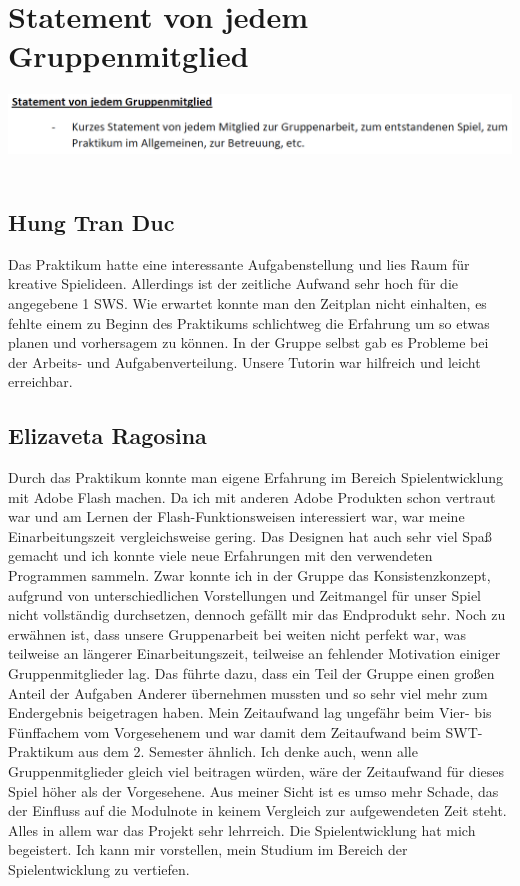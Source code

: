 \documentclass[a4paper, 11pt]{article} %
\begin{document}
\section{Statement von jedem Gruppenmitglied}
\includegraphics[scale=0.5]{images/statement.png}\\\\
\subsection{Hung Tran Duc}
Das Praktikum hatte eine interessante Aufgabenstellung und lies Raum für kreative Spielideen.
Allerdings ist der zeitliche Aufwand sehr hoch für die angegebene 1 SWS.
Wie erwartet konnte man den Zeitplan nicht einhalten, es fehlte einem zu Beginn des Praktikums schlichtweg 
die Erfahrung um so etwas planen und vorhersagem zu können.
In der Gruppe selbst gab es Probleme bei der Arbeits- und Aufgabenverteilung.
Unsere Tutorin war hilfreich und leicht erreichbar.

\subsection{Elizaveta Ragosina}
Durch das Praktikum konnte man eigene Erfahrung im Bereich Spielentwicklung mit Adobe Flash machen. Da ich mit anderen Adobe Produkten schon vertraut war und am Lernen der Flash-Funktionsweisen interessiert war, war meine Einarbeitungszeit vergleichsweise gering. Das Designen hat auch sehr viel Spaß gemacht und ich konnte viele neue Erfahrungen mit den verwendeten Programmen sammeln. Zwar konnte ich in der Gruppe das Konsistenzkonzept, aufgrund von unterschiedlichen Vorstellungen und Zeitmangel für unser Spiel nicht vollständig durchsetzen, dennoch gefällt mir das Endprodukt sehr.
Noch zu erwähnen ist, dass unsere Gruppenarbeit bei weiten nicht perfekt war, was teilweise an längerer Einarbeitungszeit, teilweise an fehlender Motivation einiger Gruppenmitglieder lag. Das führte dazu, dass ein Teil der Gruppe einen großen Anteil der Aufgaben Anderer übernehmen mussten und so sehr viel mehr zum Endergebnis beigetragen haben. Mein Zeitaufwand lag ungefähr beim Vier- bis Fünffachem vom Vorgesehenem und war damit dem Zeitaufwand beim SWT-Praktikum aus dem 2. Semester ähnlich. Ich denke auch, wenn alle Gruppenmitglieder gleich viel beitragen würden, wäre der Zeitaufwand für dieses Spiel höher als der Vorgesehene. Aus meiner Sicht ist es umso mehr Schade, das der Einfluss auf die Modulnote in keinem Vergleich zur aufgewendeten Zeit steht. \\
Alles in allem war das Projekt sehr lehrreich. Die Spielentwicklung hat mich begeistert. Ich kann mir vorstellen, mein Studium im Bereich der Spielentwicklung zu vertiefen.
\end{document}
